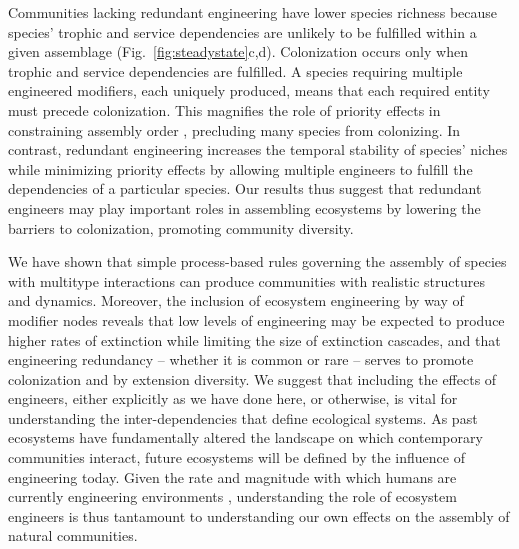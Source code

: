 \documentclass[twocolumn,preprintnumbers,amsmath,amssymb,superscriptaddress,linenumbers]{revtex4-1}
\newcommand{\rev}[1]{\textcolor{crimson}{#1}}
\begin{document}
\begin{bibunit}
Communities lacking redundant engineering have lower species richness because species' trophic and service dependencies are unlikely to be fulfilled within a given assemblage (Fig.\ \ref{fig:steadystate}c,d).
Colonization occurs only when trophic and service dependencies are fulfilled.
A species requiring multiple engineered modifiers, each uniquely produced, means that each required entity must precede colonization.
This magnifies the role of priority effects in constraining assembly order \cite{Fukami2015}, precluding many species from colonizing.
In contrast, redundant engineering increases the temporal stability of species' niches while minimizing priority effects by allowing multiple engineers to fulfill the dependencies of a particular species.
Our results thus suggest that redundant engineers may play important roles in assembling ecosystems by lowering the barriers to colonization, promoting community diversity.

We have shown that simple process-based rules governing the assembly of species with multitype interactions can produce communities with realistic structures and dynamics.
Moreover, the inclusion of ecosystem engineering by way of modifier nodes reveals that low levels of engineering may be expected to produce higher rates of extinction while limiting the size of extinction cascades, and that engineering redundancy -- whether it is common or rare -- serves to promote colonization and by extension diversity.
We suggest that including the effects of engineers, either explicitly as we have done here, or otherwise, is vital for understanding the inter-dependencies that define ecological systems.
As past ecosystems have fundamentally altered the landscape on which contemporary communities interact, future ecosystems will be defined by the influence of engineering today.
Given the rate and magnitude with which humans are currently engineering environments \cite{Corlett2015}, understanding the role of ecosystem engineers is thus tantamount to understanding our own effects on the assembly of natural communities.\\







\end{bibunit}
\end{document}

